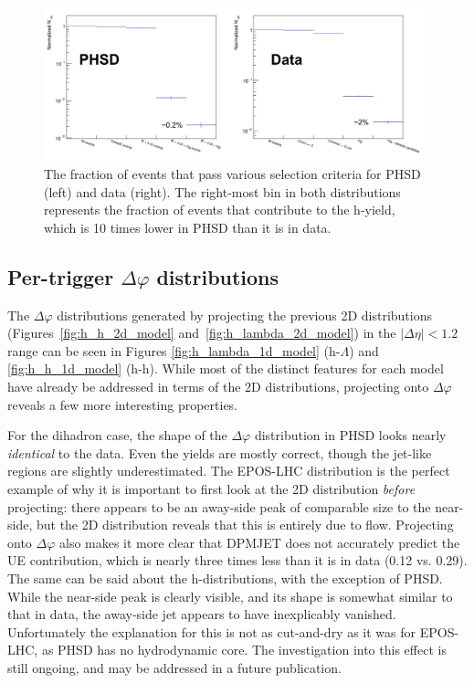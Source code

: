 \begin{figure}[ht]
\centering
\includegraphics[width=\textwidth]{figures/results/phsd_woes.png}
\caption{The fraction of events that pass various selection criteria for PHSD (left) and data (right). The right-most bin in both distributions represents the fraction of events that contribute to the h-\lmb yield, which is 10 times lower in PHSD than it is in data.}
\label{fig:phsd_woes}
\end{figure}


\subsection{Per-trigger $\Delta\varphi$ distributions}
\label{sec:model_1d_correlations}

The $\Delta\varphi$ distributions generated by projecting the previous 2D distributions (Figures~\ref{fig:h_h_2d_model} and~\ref{fig:h_lambda_2d_model}) in the $|\Delta\eta| < 1.2$ range can be seen in Figures \ref{fig:h_lambda_1d_model} (h-$\Lambda$) and \ref{fig:h_h_1d_model} (h-h). While most of the distinct features for each model have already be addressed in terms of the 2D distributions, projecting onto $\Delta\varphi$ reveals a few more interesting properties. 

For the dihadron case, the shape of the $\Delta\varphi$ distribution in PHSD looks nearly \textit{identical} to the data. Even the yields are mostly correct, though the jet-like regions are slightly underestimated. The EPOS-LHC distribution is the perfect example of why it is important to first look at the 2D distribution \textit{before} projecting: there appears to be an away-side peak of comparable size to the near-side, but the 2D distribution reveals that this is entirely due to flow. Projecting onto $\Delta\varphi$ also makes it more clear that DPMJET does not accurately predict the UE contribution, which is nearly three times less than it is in data (0.12 vs. 0.29). The same can be said about the h-\lmb distributions, with the exception of PHSD. While the near-side peak is clearly visible, and its shape is somewhat similar to that in data, the away-side jet appears to have inexplicably vanished. Unfortunately the explanation for this is not as cut-and-dry as it was for EPOS-LHC, as PHSD has no hydrodynamic core. The investigation into this effect is still ongoing, and may be addressed in a future publication.

